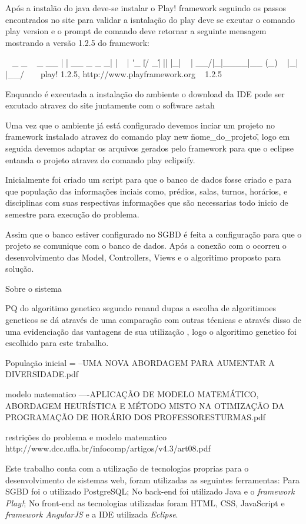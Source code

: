 Após a instalão do java deve-se instalar o Play! framework seguindo os passos encontrados no site \cite{play} para validar a isntalação do play deve se excutar o comando play version e o prompt de comando deve retornar a seguinte mensagem mostrando a versão 1.2.5 do framework:

~        _            _
~  _ __ | | __ _ _  _| |
~ | \'_ \| |/ _\' | || |_|
~ |  __/|_|\____|\__ (_)
~ |_|            |__/
~
~ play! 1.2.5, http://www.playframework.org
~
1.2.5

Enquando é executada a instalação do ambiente o download da IDE pode ser excutado atravez do site \cite{eclipse} juntamente com o software astah \cite{astah}\par

Uma vez que o ambiente já está configurado devemos inciar um projeto no framework instalado atravez do comando play new \"nome_do_projeto\", logo em seguida devemos adaptar os arquivos gerados pelo framework para que o eclipse entanda o projeto atravez do comando play eclipsify.


Inicialmente foi criado um script para que o banco de dados fosse criado e para que população das informações inciais como, prédios, salas, turnos, horários, e disciplinas com suas respectivas informações que são necessarias todo inicio de semestre para execução do problema.

Assim que o banco estiver configurado no SGBD é feita a configuração para que o projeto se comunique com o banco de dados. Após a conexão com o ocorreu o desenvolvimento das Model, Controllers, Views e o algoritimo proposto para solução.

Sobre o sistema

PQ do algoritimo genetico
segundo renand dupas a escolha de algoritimoes geneticos se dá através de uma comparação com outras técnicas e através disso de uma evidenciação das vantagens de sua utilização , logo o algoritimo genetico foi escolhido para este trabalho.

População inicial = --UMA NOVA ABORDAGEM PARA AUMENTAR A DIVERSIDADE.pdf

modelo matematico ----APLICAÇÃO DE MODELO MATEMÁTICO, ABORDAGEM HEURÍSTICA E MÉTODO MISTO NA OTIMIZAÇÃO DA PROGRAMAÇÃO DE HORÁRIO DOS PROFESSORESTURMAS.pdf

restrições do problema e modelo matematico http://www.dcc.ufla.br/infocomp/artigos/v4.3/art08.pdf


Este trabalho conta com a utilização de tecnologias proprias para o desenvolvimento de sistemas web, foram utilizadas as seguintes ferramentas: Para SGBD foi o utilizado PostgreSQL; No back-end foi utilizado Java e o \textit{framework Play!}; No front-end as tecnologias utilizadas foram HTML, CSS, JavaScript e \textit{framework AngularJS} e a IDE utilizada \textit{Eclipse}.\par

